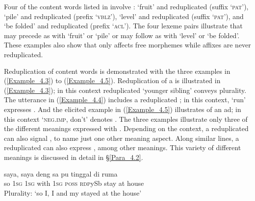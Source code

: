 Four of the content words listed in  involve :  ‘fruit’ and reduplicated  (suffix  ‘\textsc{pat}’),  ‘pile’ and reduplicated  (prefix  ‘\textsc{vblz}’),  ‘level’ and reduplicated \textitbf{{}-}\textitbf{{}-} (suffix  ‘\textsc{pat}’), and  ‘be folded’ and reduplicated  (prefix  ‘\textsc{acl}’). The four lexeme pairs illustrate that  may precede  as with  ‘fruit’ or  ‘pile’ or may follow  as with  ‘level’ or  ‘be folded’. These examples also show that  only affects free morphemes while affixes are never reduplicated.



Reduplication of content words is demonstrated with the three examples in (\ref{Example_4.3}) to (\ref{Example_4.5}). Reduplication of a  is illustrated in (\ref{Example_4.3}); in this context reduplicated  ‘younger sibling’ conveys plurality. The utterance in (\ref{Example_4.4}) includes a reduplicated ; in this context,  ‘run’ expresses . And the elicited example in (\ref{Example_4.5}) illustrates  of an ad; in this context   ‘\textsc{neg.imp}, don’t’ denotes . The three examples illustrate only three of the different meanings expressed with . Depending on the context, a reduplicated  can also signal , to name just one other meaning aspect. Along similar lines, a reduplicated  can also express , among other meanings. This variety of different meanings is discussed in detail in §\ref{Para_4.2}.


\ea
\label{Example_4.3}

 {saya}, {saya} {deng} {sa} {pu} {} {tinggal} {di} {ruma}\\ %
 so  \textsc{1sg}  \textsc{1sg}  with  \textsc{1sg}  \textsc{poss}  \textsc{rdp}{\Tilde}ySb  stay  at  house\\
\glt 
Plurality: ‘so I, I and my  stayed at the house’ \textstyleExampleSource{[081014-014-NP.0002]}
\z

